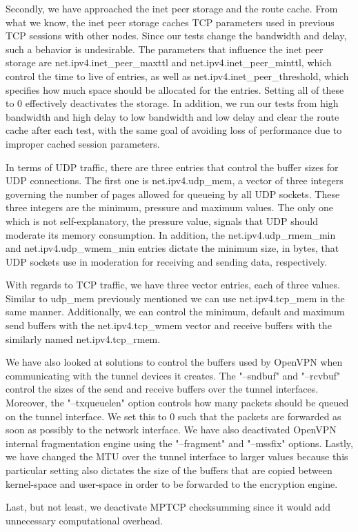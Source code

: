 Secondly, we have approached the inet peer storage and the route cache. From
what we know, the inet peer storage caches TCP parameters used in previous TCP
sessions with other nodes. Since our tests change the bandwidth and delay,
such a behavior is undesirable. The parameters that influence the inet peer
storage are net.ipv4.inet_peer_maxttl and net.ipv4.inet_peer_minttl, which
control the time to live of entries, as well as net.ipv4.inet_peer_threshold,
which specifies how much space should be allocated for the entries. Setting
all of these to 0 effectively deactivates the storage. In addition, we run our
tests from high bandwidth and high delay to low bandwidth and low delay and
clear the route cache after each test, with the same goal of avoiding loss of
performance due to improper cached session parameters.

In terms of UDP traffic, there are three entries that control the buffer sizes
for UDP connections. The first one is net.ipv4.udp_mem, a vector of three
integers governing the number of pages allowed for queueing by all UDP
sockets. These three integers are the minimum, pressure and maximum values.
The only one which is not self-explanatory, the pressure value, signals that
UDP should moderate its memory consumption. In addition, the
net.ipv4.udp_rmem_min and net.ipv4.udp_wmem_min entries dictate the minimum
size, in bytes, that UDP sockets use in moderation for receiving and sending
data, respectively.

With regards to TCP traffic, we have three vector entries, each of three
values. Similar to udp_mem previously mentioned we can use net.ipv4.tcp_mem in
the same manner. Additionally, we can control the minimum, default and maximum
send buffers with the net.ipv4.tcp_wmem vector and receive buffers with the
similarly named net.ipv4.tcp_rmem.

We have also looked at solutions to control the buffers used by OpenVPN when
communicating with the tunnel devices it creates. The "--sndbuf" and
"--rcvbuf" control the sizes of the send and receive buffers over the tunnel
interfaces. Moreover, the "--txqueuelen" option controls how many packets
should be queued on the tunnel interface. We set this to 0 such that the
packets are forwarded as soon as possibly to the network interface. We have
also deactivated OpenVPN internal fragmentation engine using the "--fragment"
and "--mssfix" options. Lastly, we have changed the MTU over the tunnel
interface to larger values because this particular setting also dictates the
size of the buffers that are copied between kernel-space and user-space in
order to be forwarded to the encryption engine.

Last, but not least, we deactivate MPTCP checksumming since it would add
unnecessary computational overhead.
